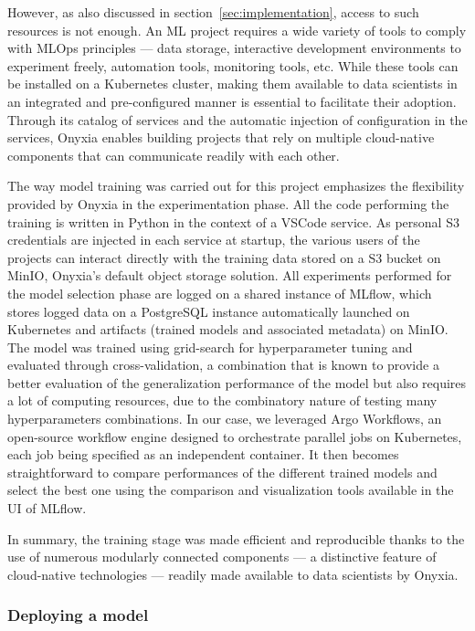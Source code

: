 \documentclass[graybox]{svmult}
\begin{document}
However, as also discussed in section~\ref{sec:implementation}, access to such resources is not enough. An ML project requires a wide variety of tools to comply with MLOps principles — data storage, interactive development environments to experiment freely, automation tools, monitoring tools, etc. While these tools can be installed on a Kubernetes cluster, making them available to data scientists in an integrated and pre-configured manner is essential to facilitate their adoption. Through its catalog of services and the automatic injection of configuration in the services, Onyxia enables building projects that rely on multiple cloud-native components that can communicate readily with each other.

The way model training was carried out for this project emphasizes the flexibility provided by Onyxia in the experimentation phase. All the code performing the training is written in Python in the context of a VSCode service. As personal S3 credentials are injected in each service at startup, the various users of the projects can interact directly with the training data stored on a S3 bucket on MinIO, Onyxia's default object storage solution. All experiments performed for the model selection phase are logged on a shared instance of MLflow, which stores logged data on a PostgreSQL instance automatically launched on Kubernetes and artifacts (trained models and associated metadata) on MinIO. The model was trained using grid-search for hyperparameter tuning and evaluated through cross-validation, a combination that is known to provide a better evaluation of the generalization performance of the model but also requires a lot of computing resources, due to the combinatory nature of testing many hyperparameters combinations. In our case, we leveraged Argo Workflows, an open-source workflow engine designed to orchestrate parallel jobs on Kubernetes, each job being specified as an independent container. It then becomes straightforward to compare performances of the different trained models and select the best one using the comparison and visualization tools available in the UI of MLflow. 

In summary, the training stage was made efficient and reproducible thanks to the use of numerous modularly connected components — a distinctive feature of cloud-native technologies — readily made available to data scientists by Onyxia.

\subsubsection{Deploying a model}
\end{document}

